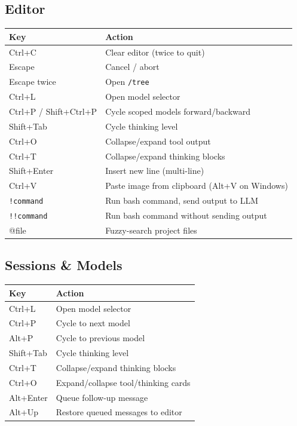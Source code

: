 \documentclass[12pt]{article}
\begin{document}
\subsection*{Editor}
\begin{tabular}{@{}ll@{}}
\toprule
\textbf{Key} & \textbf{Action} \\
\midrule
Ctrl+C & Clear editor (twice to quit) \\
Escape & Cancel / abort \\
Escape twice & Open \texttt{/tree} \\
Ctrl+L & Open model selector \\
Ctrl+P / Shift+Ctrl+P & Cycle scoped models forward/backward \\
Shift+Tab & Cycle thinking level \\
Ctrl+O & Collapse/expand tool output \\
Ctrl+T & Collapse/expand thinking blocks \\
Shift+Enter & Insert new line (multi-line) \\
Ctrl+V & Paste image from clipboard (Alt+V on Windows) \\
\texttt{!command} & Run bash command, send output to LLM \\
\texttt{!!command} & Run bash command without sending output \\
@file & Fuzzy-search project files \\
\bottomrule
\end{tabular}

\subsection*{Sessions \& Models}
\begin{tabular}{@{}ll@{}}
\toprule
\textbf{Key} & \textbf{Action} \\
\midrule
Ctrl+L & Open model selector \\
Ctrl+P & Cycle to next model \\
Alt+P & Cycle to previous model \\
Shift+Tab & Cycle thinking level \\
Ctrl+T & Collapse/expand thinking blocks \\
Ctrl+O & Expand/collapse tool/thinking cards \\
Alt+Enter & Queue follow-up message \\
Alt+Up & Restore queued messages to editor \\
\bottomrule
\end{tabular}
\end{document}
